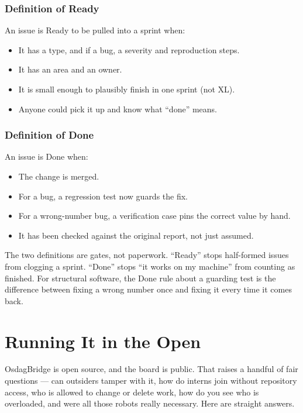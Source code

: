 \documentclass[11pt,a4paper]{report}
\begin{document}
\section{Definition of Ready}
An issue is Ready to be pulled into a sprint when:
\begin{itemize}[leftmargin=1.4em,itemsep=1pt]
  \item It has a type, and if a bug, a severity and reproduction steps.
  \item It has an area and an owner.
  \item It is small enough to plausibly finish in one sprint (not XL).
  \item Anyone could pick it up and know what ``done'' means.
\end{itemize}

\section{Definition of Done}
An issue is Done when:
\begin{itemize}[leftmargin=1.4em,itemsep=1pt]
  \item The change is merged.
  \item For a bug, a regression test now guards the fix.
  \item For a wrong-number bug, a verification case pins the correct value by hand.
  \item It has been checked against the original report, not just assumed.
\end{itemize}

\begin{plainenglish}
The two definitions are gates, not paperwork. ``Ready'' stops half-formed issues
from clogging a sprint. ``Done'' stops ``it works on my machine'' from counting as
finished. For structural software, the Done rule about a guarding test is the
difference between fixing a wrong number once and fixing it every time it comes
back.
\end{plainenglish}

\part{Running It in the Open}

OsdagBridge is open source, and the board is public. That raises a handful of fair
questions --- can outsiders tamper with it, how do interns join without repository
access, who is allowed to change or delete work, how do you see who is overloaded,
and were all those robots really necessary. Here are straight answers.
\end{document}
